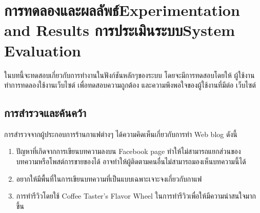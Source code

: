 \chapter{\ifproject%
\ifcpe การทดลองและผลลัพธ์\else Experimentation and Results\fi
\else%
\ifcpe การประเมินระบบ\else System Evaluation\fi
\fi}

ในบทนี้จะทดสอบเกี่ยวกับการทำงานในฟังก์ชันหลักๆของระบบ โดยจะมีการทดสอบโดยให้
ผู้ใช้งานทำการทดลองใช้งานเว็บไซต์ เพื่อทดสอบความถูกต้อง และความพึงพอใจของผู้ใช้งานที่มีต่อ
เว็บไซต์

\section{การสำรวจและค้นคว้า}
การสำรวจจากผู้ประกอบการร้านกาแฟต่างๆ ได้ความคิดเห็นเกี่ยวกับการทำ Web blog ดังนี้
\begin{enumerate}
  \item ปัญหาที่เกิดจากการเขียนบทความลงบน Facebook page ทำให้ไม่สามารถแยกส่วนของบทความหรือโพสต์การขายของได้ อาจทำให้ผู้ติดตามคนอื่นไม่สามารถมองเห็นบทความนี้ได้
  \item อยากให้มีพื้นที่ในการเขียนบทความที่เป็นแบบเฉพาะเจาะจงเกี่ยวกับกาแฟ
  \item การทำรีวิวโดยใช้ Coffee Taster's Flavor Wheel ในการทำรีวิวเพื่อให้มีความน่าสนใจมากขึ้น
\end{enumerate}